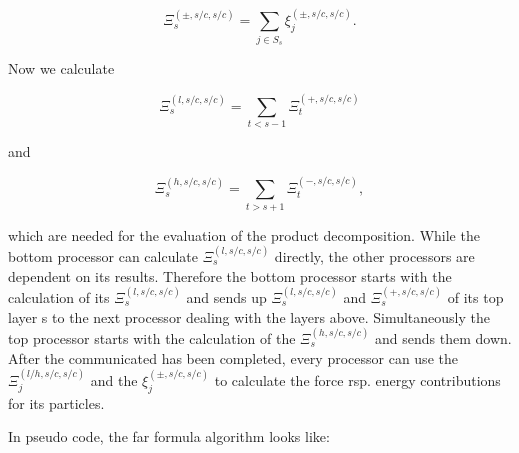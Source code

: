 \[ \Xi^{(\pm,s/c,s/c)}_s= \sum_{j\in S_s}\xi^{(\pm,s/c,s/c)}_j. \]

Now we calculate

\[ \Xi^{(l,s/c,s/c)}_s=\sum_{t < s - 1}\Xi^{(+,s/c,s/c)}_t \]

and

\[ \Xi^{(h,s/c,s/c)}_s=\sum_{t > s + 1}\Xi^{(-,s/c,s/c)}_t, \]

which are needed for the evaluation of the product decomposition.
While the bottom processor can calculate $\Xi^{(l,s/c,s/c)}_s$
directly, the other processors are dependent on its results. Therefore
the bottom processor starts with the calculation of its
$\Xi^{(l,s/c,s/c)}_s$ and sends up $\Xi^{(l,s/c,s/c)}_s$ and
$\Xi^{(+,s/c,s/c)}_s$ of its top layer s to the next processor dealing
with the layers above. Simultaneously the top processor starts with
the calculation of the $\Xi^{(h,s/c,s/c)}_s$ and sends them down.
After the communicated has been completed, every processor can use the
$\Xi^{(l/h,s/c,s/c)}_j$ and the $\xi^{(\pm,s/c,s/c)}_j$ to calculate
the force rsp. energy contributions for its particles.

In pseudo code, the far formula algorithm looks like:

